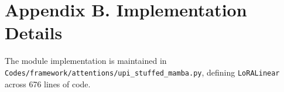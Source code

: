\section*{Appendix B. Implementation Details}
The module implementation is maintained in \texttt{Codes/framework/attentions/upi\_stuffed\_mamba.py}, defining \texttt{LoRALinear} across 676 lines of code.
